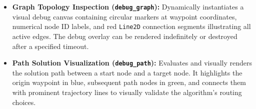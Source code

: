 \begin{itemize}
    \item \textbf{Graph Topology Inspection (\texttt{debug\_graph}):} Dynamically instantiates a visual debug canvas containing circular markers at waypoint coordinates, numerical node ID labels, and red \texttt{Line2D} connection segments illustrating all active edges. The debug overlay can be rendered indefinitely or destroyed after a specified timeout.
    \item \textbf{Path Solution Visualization (\texttt{debug\_path}):} Evaluates and visually renders the solution path between a start node and a target node. It highlights the origin waypoint in blue, subsequent path nodes in green, and connects them with prominent trajectory lines to visually validate the algorithm's routing choices.
\end{itemize}

